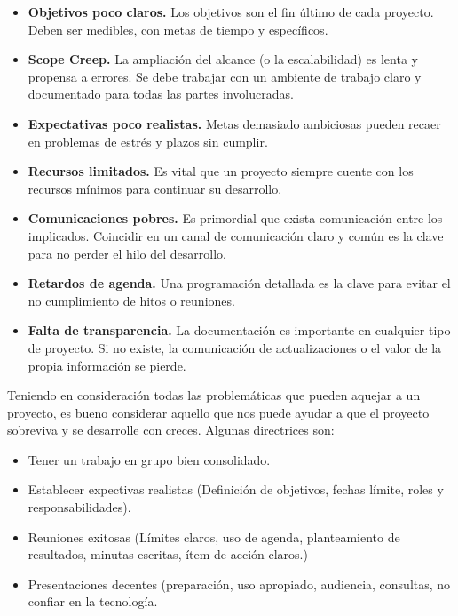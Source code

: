 \begin{itemize}
\item \textbf{Objetivos poco claros.} Los objetivos son el
  fin último de cada proyecto. Deben ser medibles, con metas
  de tiempo y específicos.
\item \textbf{Scope Creep.} La ampliación del alcance (o la
  escalabilidad) es lenta y propensa a errores. Se debe
  trabajar con un ambiente de trabajo claro y documentado
  para todas las partes involucradas.
\item \textbf{Expectativas poco realistas.} Metas demasiado
  ambiciosas pueden recaer en problemas de estrés y plazos
  sin cumplir.
\item \textbf{Recursos limitados.} Es vital que un proyecto
  siempre cuente con los recursos mínimos para continuar
  su desarrollo.
\item \textbf{Comunicaciones pobres.} Es primordial que
  exista comunicación entre los implicados. Coincidir en
  un canal de comunicación claro y común es la clave
  para no perder el hilo del desarrollo.
\item \textbf{Retardos de agenda.} Una programación
  detallada es la clave para evitar el no cumplimiento
  de hitos o reuniones.
\item \textbf{Falta de transparencia.} La documentación es
  importante en cualquier tipo de proyecto. Si no existe,
  la comunicación de actualizaciones o el valor de la propia
  información se pierde.
\end{itemize}

Teniendo en consideración todas las problemáticas que pueden
aquejar a un proyecto, es bueno considerar aquello que nos
puede ayudar a que el proyecto sobreviva y se desarrolle
con creces. Algunas directrices son:

\begin{itemize}
\item{Tener un trabajo en grupo bien consolidado.}
\item{Establecer expectivas realistas (Definición de
objetivos, fechas límite, roles y responsabilidades).}
\item{Reuniones exitosas (Límites claros, uso de agenda,
  planteamiento de resultados, minutas escritas, ítem de
  acción claros.)}
\item{Presentaciones decentes (preparación, uso apropiado,
audiencia, consultas, no confiar en la tecnología.}
\end{itemize}
